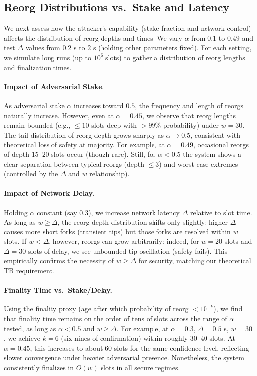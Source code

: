 \subsection{Reorg Distributions vs.\ Stake and Latency}
We next assess how the attacker’s capability (stake fraction and network control) affects the distribution of reorg depths and times. We vary $\alpha$ from $0.1$ to $0.49$ and test $\Delta$ values from $0.2$ s to $2$ s (holding other parameters fixed). For each setting, we simulate long runs (up to $10^6$ slots) to gather a distribution of reorg lengths and finalization times.

\paragraph{Impact of Adversarial Stake.}
As adversarial stake $\alpha$ increases toward $0.5$, the frequency and length of reorgs naturally increase. However, even at $\alpha=0.45$, we observe that reorg lengths remain bounded (e.g., $\le 10$ slots deep with $>99\%$ probability) under $w=30$. The tail distribution of reorg depth grows sharply as $\alpha\to 0.5$, consistent with theoretical loss of safety at majority. For example, at $\alpha=0.49$, occasional reorgs of depth $15$--$20$ slots occur (though rare). Still, for $\alpha < 0.5$ the system shows a clear separation between typical reorgs (depth $\le 3$) and worst-case extremes (controlled by the $\Delta$ and $w$ relationship).

\paragraph{Impact of Network Delay.}
Holding $\alpha$ constant (say $0.3$), we increase network latency $\Delta$ relative to slot time. As long as $w \ge \Delta$, the reorg depth distribution shifts only slightly: higher $\Delta$ causes more short forks (transient tips) but those forks are resolved within $w$ slots. If $w < \Delta$, however, reorgs can grow arbitrarily: indeed, for $w=20$ slots and $\Delta=30$ slots of delay, we see unbounded tip oscillation (safety fails). This empirically confirms the necessity of $w\ge \Delta$ for security, matching our theoretical TB requirement.

\paragraph{Finality Time vs.\ Stake/Delay.}
Using the finality proxy (age after which probability of reorg $<10^{-k}$), we find that finality time remains on the order of tens of slots across the range of $\alpha$ tested, as long as $\alpha<0.5$ and $w\ge \Delta$. For example, at $\alpha=0.3$, $\Delta=0.5$ s, $w=30$, we achieve $k=6$ (six nines of confirmation) within roughly $30$--$40$ slots. At $\alpha=0.45$, this increases to about $60$ slots for the same confidence level, reflecting slower convergence under heavier adversarial presence. Nonetheless, the system consistently finalizes in $O(w)$ slots in all secure regimes.
